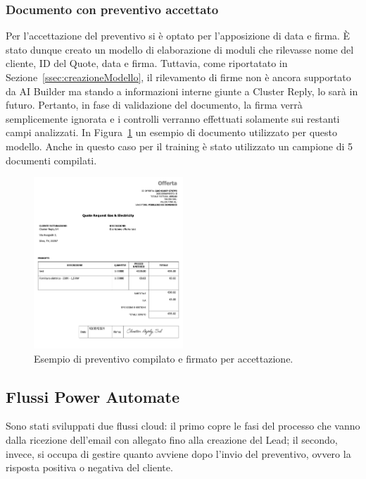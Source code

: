 \subsubsection{Documento con preventivo accettato}
Per l'accettazione del preventivo si è optato per l'apposizione di data e firma. È stato dunque creato un modello di elaborazione di moduli che rilevasse nome del cliente, ID del Quote, data e firma. Tuttavia, come riportatato in Sezione~\ref{ssec:creazioneModello}, il rilevamento di firme non è ancora supportato da AI Builder ma stando a informazioni interne giunte a Cluster Reply, lo sarà in futuro. Pertanto, in fase di validazione del documento, la firma verrà semplicemente ignorata e i controlli verranno effettuati solamente sui restanti campi analizzati. In Figura~\ref{fig:documentoPreventivo} un esempio di documento utilizzato per questo modello. Anche in questo caso per il training è stato utilizzato un campione di \num{5} documenti compilati.

\begin{figure}[ht!]
  \centering
  \includegraphics[width=0.5\textwidth]{documento-preventivo.png}
  \caption{Esempio di preventivo compilato e firmato per accettazione.}
  \label{fig:documentoPreventivo}
\end{figure}

\subsection{Flussi Power Automate}
Sono stati sviluppati due flussi cloud: il primo copre le fasi del processo che vanno dalla ricezione dell'email con allegato fino alla creazione del Lead; il secondo, invece, si occupa di gestire quanto avviene dopo l'invio del preventivo, ovvero la risposta positiva o negativa del cliente.


